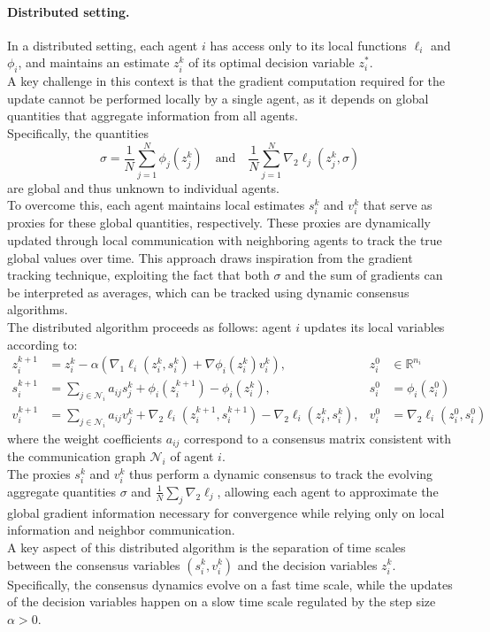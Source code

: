 \paragraph{Distributed setting.}
In a distributed setting, each agent \(i\) has access only to its local functions \(\ell_i\) and \(\phi_i\), and maintains an estimate \(z_i^k\) of its optimal decision variable \(z_i^*\).  \\
A key challenge in this context is that the gradient computation required for the update cannot be performed locally by a single agent, as it depends on global quantities that aggregate information from all agents. \\ Specifically, the quantities 
\[
\sigma = \frac{1}{N} \sum_{j=1}^N \phi_j(z_j^k) \quad \text{and} \quad \frac{1}{N}\sum_{j=1}^N \nabla_2 \ell_j(z_j^k, \sigma)
\]
are global and thus unknown to individual agents. \\
To overcome this, each agent maintains local estimates \(s_i^k\) and \(v_i^k\) that serve as proxies for these global quantities, respectively. These proxies are dynamically updated through local communication with neighboring agents to track the true global values over time. This approach draws inspiration from the gradient tracking technique, exploiting the fact that both \(\sigma\) and the sum of gradients can be interpreted as averages, which can be tracked using dynamic consensus algorithms. \\
The distributed algorithm proceeds as follows: agent \(i\) updates its local variables according to:
\begin{align*}
z_i^{k+1} &= z_i^k - \alpha \left( \nabla_1 \ell_i(z_i^k, s_i^k) + \nabla \phi_i(z_i^k) v_i^k \right), & z_i^0 &\in \mathbb{R}^{n_i} \\
s_i^{k+1} &= \sum_{j \in \mathcal{N}_i} a_{ij} s_j^k + \phi_i(z_i^{k+1}) - \phi_i(z_i^k), & s_i^0 &= \phi_i(z_i^0) \\
v_i^{k+1} &= \sum_{j \in \mathcal{N}_i} a_{ij} v_j^k + \nabla_2 \ell_i(z_i^{k+1}, s_i^{k+1}) - \nabla_2 \ell_i(z_i^k, s_i^k), & v_i^0 &= \nabla_2 \ell_i(z_i^0, s_i^0)
\end{align*}
where the weight coefficients \(a_{ij}\) correspond to a consensus matrix consistent with the communication graph \(\mathcal{N}_i\) of agent \(i\). \\
The proxies \(s_i^k\) and \(v_i^k\) thus perform a dynamic consensus to track the evolving aggregate quantities \(\sigma\) and \(\frac{1}{N}\sum_j \nabla_2 \ell_j\), allowing each agent to approximate the global gradient information necessary for convergence while relying only on local information and neighbor communication. \\
A key aspect of this distributed algorithm is the separation of time scales between the consensus variables \((s_i^k, v_i^k)\) and the decision variables \(z_i^k\). Specifically, the consensus dynamics evolve on a fast time scale, while the updates of the decision variables happen on a slow time scale regulated by the step size \(\alpha > 0\).

